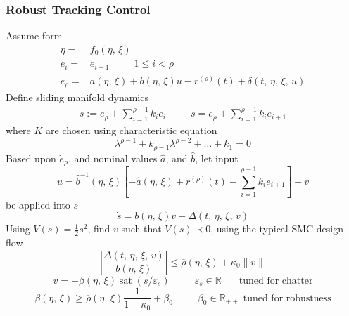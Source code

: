\documentclass[twocolumn]{article}    %
\begin{document}
\subsubsection*{Robust Tracking Control}
Assume form
\begin{align*}
    \dot{\eta} =& f_0(\eta,\,\xi)\\
    \dot{e}_i =& e_{i+1} \hspace{30pt} 1 \leq i < \rho\\
    \dot{e}_\rho =& a(\eta,\,\xi) + b(\eta,\,\xi)u - r^{(\rho)}(t) + \delta(t,\,\eta,\,\xi,\,u)
\end{align*}
Define sliding manifold dynamics
\begin{align*}
    s := e_\rho + \sum_{i=1}^{\rho-1} k_ie_i \hspace{30pt} \dot{s} = \dot{e}_\rho  + \sum_{i=1}^{\rho-1} k_ie_{i+1}
\end{align*}
where \(K\) are chosen using characteristic equation 
\begin{equation*}
    \lambda^{\rho-1} + k_{\rho-1}\lambda^{\rho-2} + \dots + k_1 = 0
\end{equation*}
Based upon \(\dot{e}_\rho\), and nominal values \(\hat{a}\), and \(\hat{b}\), let input 
\begin{equation*}
    u = \hat{b}^{-1}(\eta,\,\xi) \left[ -\hat{a}(\eta,\,\xi) + r^{(\rho)}(t) - \sum_{i=1}^{\rho-1} k_ie_{i+1}\right] + v
\end{equation*}
be applied into \(\dot{s}\)
\begin{equation*}
    \dot{s} = b(\eta,\,\xi)v + \Delta(t,\,\eta,\,\xi,\,v)
\end{equation*}
Using \(V(s) = \frac{1}{2}s^2\), find \(v\) such that \(\dot{V}(s) \prec 0\), using the typical SMC design flow
\begin{equation*}
    \left| \frac{\Delta(t,\,\eta,\,\xi,\,v)}{b(\eta,\,\xi)}\right| \leq \overline{\rho}(\eta,\,\xi)  + \kappa_0\|v\|
\end{equation*}
\begin{equation*}
    v = - \beta(\eta,\,\xi) \operatorname{sat}(s/\varepsilon_s) \hspace{30pt} \varepsilon_s\in\mathds{R}_{++} \text{ tuned for chatter}
\end{equation*}
\begin{equation*}
    \beta(\eta,\,\xi) \geq \overline{\rho}(\eta,\,\xi) \frac{1}{1-\kappa_0} + \beta_0 \hspace{30pt} \beta_0\in\mathds{R}_{++} \text{ tuned for robustness}
\end{equation*}
\end{document}
